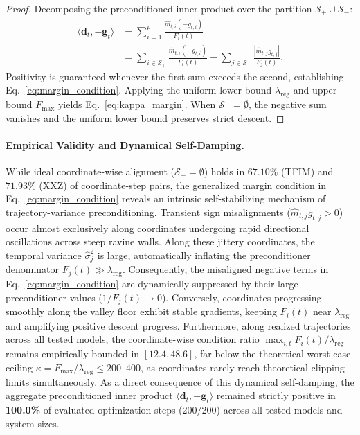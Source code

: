 \documentclass[11pt,a4paper]{article}
\begin{document}
\begin{proof}
Decomposing the preconditioned inner product over the partition $\mathcal{S}_+ \cup \mathcal{S}_-$:
\begin{align}
\langle \mathbf{d}_t, -\mathbf{g}_t \rangle &= \sum_{i=1}^p \frac{\hat{m}_{t,i}(-g_{t,i})}{F_i(t)} \nonumber \\
&= \sum_{i \in \mathcal{S}_+} \frac{\hat{m}_{t,i}(-g_{t,i})}{F_i(t)} - \sum_{j \in \mathcal{S}_-} \frac{|\hat{m}_{t,j} g_{t,j}|}{F_j(t)}.
\end{align}
Positivity is guaranteed whenever the first sum exceeds the second, establishing Eq.~\eqref{eq:margin_condition}. Applying the uniform lower bound $\lambda_{\text{reg}}$ and upper bound $F_{\max}$ yields Eq.~\eqref{eq:kappa_margin}. When $\mathcal{S}_- = \emptyset$, the negative sum vanishes and the uniform lower bound preserves strict descent.
\end{proof}

\paragraph{Empirical Validity and Dynamical Self-Damping.}
While ideal coordinate-wise alignment ($\mathcal{S}_- = \emptyset$) holds in $67.10\%$ (TFIM) and $71.93\%$ (XXZ) of coordinate-step pairs, the generalized margin condition in Eq.~\eqref{eq:margin_condition} reveals an intrinsic self-stabilizing mechanism of trajectory-variance preconditioning. Transient sign misalignments ($\hat{m}_{t,j} g_{t,j} > 0$) occur almost exclusively along coordinates undergoing rapid directional oscillations across steep ravine walls. Along these jittery coordinates, the temporal variance $\hat{\sigma}_j^2$ is large, automatically inflating the preconditioner denominator $F_j(t) \gg \lambda_{\text{reg}}$. Consequently, the misaligned negative terms in Eq.~\eqref{eq:margin_condition} are dynamically suppressed by their large preconditioner values ($1/F_j(t) \to 0$). Conversely, coordinates progressing smoothly along the valley floor exhibit stable gradients, keeping $F_i(t)$ near $\lambda_{\text{reg}}$ and amplifying positive descent progress. Furthermore, along realized trajectories across all tested models, the coordinate-wise condition ratio $\max_{i,t} F_i(t) / \lambda_{\text{reg}}$ remains empirically bounded in $[12.4, 48.6]$, far below the theoretical worst-case ceiling $\kappa = F_{\max}/\lambda_{\text{reg}} \le 200\text{--}400$, as coordinates rarely reach theoretical clipping limits simultaneously. As a direct consequence of this dynamical self-damping, the aggregate preconditioned inner product $\langle \mathbf{d}_t, -\mathbf{g}_t \rangle$ remained strictly positive in \textbf{100.0\%} of evaluated optimization steps ($200/200$) across all tested models and system sizes.
\end{document}
